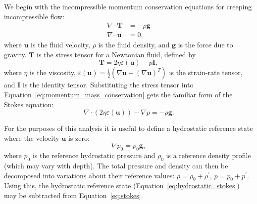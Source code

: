 \documentclass[preprint,12pt,authoryear]{elsarticle}
\begin{document}
We begin with the incompressible momentum conservation equations for creeping incompressible flow:
\begin{equation}
\begin{aligned}
\nabla \cdot \mathbf{T} &= - \rho \mathbf{g} \\
\nabla \cdot \mathbf{u} &= 0,
\end{aligned}
\label{eq:momentum_mass_conservation}
\end{equation}
where $\mathbf{u}$ is the fluid velocity, $\rho$ is the fluid density, and $\mathbf{g}$ is the force due to gravity.
$\mathbf{T}$ is the stress tensor for a Newtonian fluid, defined by
\begin{equation}
\mathbf{T} = 2 \eta \varepsilon(\mathbf{u}) - p \mathbf{I},
\label{eq:stress_tensor}
\end{equation}
where $\eta$ is the viscosity, $\varepsilon(\mathbf{u}) = \frac{1}{2}(\nabla \mathbf{u} + (\nabla \mathbf{u} )^T )$
is the strain-rate tensor, and $\mathbf{I}$ is the identity tensor.
Substituting the stress tensor into Equation~\eqref{eq:momentum_mass_conservation} gets the familiar form of the Stokes equation:
\begin{equation}
\nabla \cdot \left( 2 \eta \varepsilon( \mathbf{u} ) \right) - \nabla p = - \rho \mathbf{g}.
\label{eq:stokes}
\end{equation}

For the purposes of this analysis it is useful to define a hydrostatic reference state where the 
velocity $\mathbf{u}$ is zero:
\begin{equation}
\nabla p_0 = \rho_0 \mathbf{g},
\label{eq:hydrostatic_stokes}
\end{equation}
where $p_0$ is the reference hydrostatic pressure and $\rho_0$ is a reference density profile (which may vary with depth).
The total pressure and density can then be decomposed into variations about their 
reference values: $\rho = \rho_0 + \rho^\prime$, $p = p_0 + p^\prime$.
Using this, the hydrostatic reference state (Equation~\eqref{eq:hydrostatic_stokes}) may be subtracted from Equation~\eqref{eq:stokes}.
\end{document}
